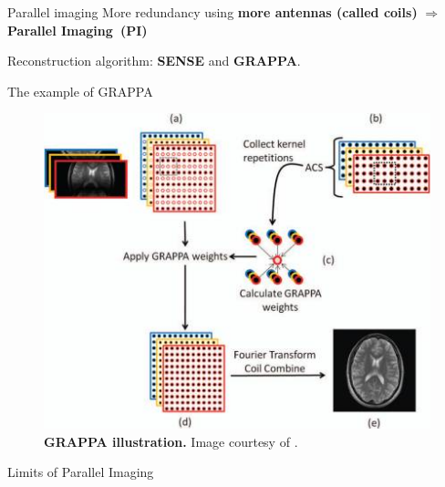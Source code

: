 \begin{frame}{Parallel imaging}
    More redundancy using \textbf{more antennas (called coils)} $\Rightarrow$ \textbf{Parallel Imaging~(PI)}
     
    Reconstruction algorithm: \textbf{SENSE} and \textbf{GRAPPA}.
\end{frame}

\begin{frame}{The example of GRAPPA}
    \begin{figure}
        \centering
        \includegraphics[height=0.6\textheight]{Figures/intro_figures/GRAPPA.jpeg}
        \caption{\label{fig:GRAPPA}\textbf{GRAPPA illustration.} Image courtesy of \citet{deshmane2012parallel}.
        }
    \end{figure} 
\end{frame}

\begin{frame}{Limits of Parallel Imaging}
\end{frame}